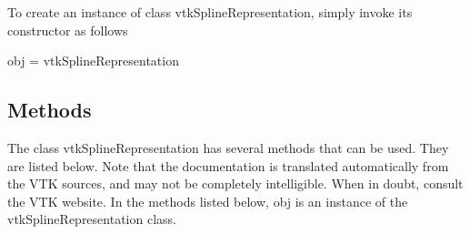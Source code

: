 To create an instance of class vtk\-Spline\-Representation, simply invoke its constructor as follows \begin{DoxyVerb}  obj = vtkSplineRepresentation
\end{DoxyVerb}
 \hypertarget{vtkwidgets_vtkxyplotwidget_Methods}{}\subsection{Methods}\label{vtkwidgets_vtkxyplotwidget_Methods}
The class vtk\-Spline\-Representation has several methods that can be used. They are listed below. Note that the documentation is translated automatically from the V\-T\-K sources, and may not be completely intelligible. When in doubt, consult the V\-T\-K website. In the methods listed below, {\ttfamily obj} is an instance of the vtk\-Spline\-Representation class. 
